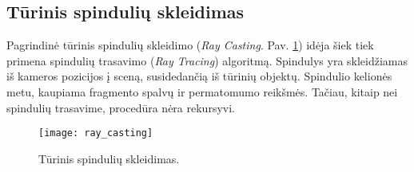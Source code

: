\subsection{Tūrinis spindulių skleidimas}

Pagrindinė tūrinis spindulių skleidimo  (\emph{Ray Casting}. Pav.
\ref{fig:ray_casting}) idėja šiek tiek primena spindulių trasavimo (\emph{Ray
Tracing}) algoritmą. Spindulys yra skleidžiamas iš kameros pozicijos į sceną,
susidedančią iš tūrinių objektų. Spindulio kelionės metu, kaupiama fragmento
spalvų ir permatomumo reikšmės. Tačiau, kitaip nei spindulių trasavime,
procedūra nėra rekursyvi.

\begin{figure}[!ht]
\centering
\texttt{[image: ray\_casting]}
\caption{Tūrinis spindulių skleidimas.}
\label{fig:ray_casting}
\end{figure}

